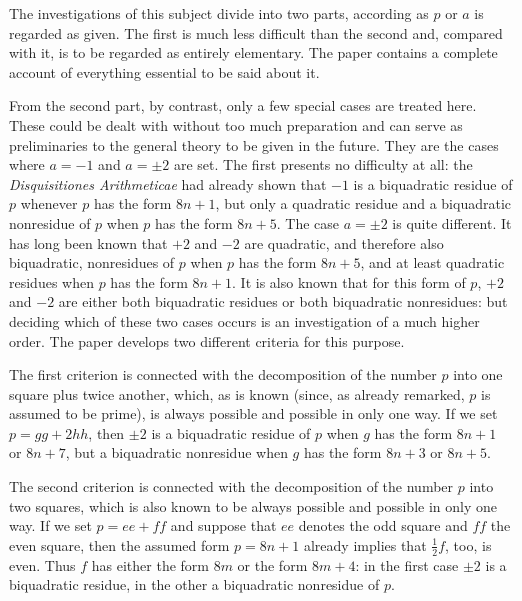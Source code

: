 The investigations of this subject divide into two parts, according as $p$ or $a$ is regarded as given. The first is much less difficult than the second and, compared with it, is to be regarded as entirely elementary. The paper contains a complete account of everything essential to be said about it.

From the second part, by contrast, only a few special cases are treated here. These could be dealt with without too much preparation and can serve as preliminaries to the general theory to be given in the future. They are the cases where $a=-1$ and $a=\pm2$ are set. The first presents no difficulty at all: the \emph{Disquisitiones Arithmeticae} had already shown that $-1$ is a biquadratic residue of $p$ whenever $p$ has the form $8n+1$, but only a quadratic residue and a biquadratic nonresidue of $p$ when $p$ has the form $8n+5$. The case $a=\pm2$ is quite different. It has long been known that $+2$ and $-2$ are quadratic, and therefore also biquadratic, nonresidues of $p$ when $p$ has the form $8n+5$, and at least quadratic residues when $p$ has the form $8n+1$. It is also known that for this form of $p$, $+2$ and $-2$ are either both biquadratic residues or both biquadratic nonresidues:
%
but deciding which of these two cases occurs is an investigation of a much higher order. The paper develops two different criteria for this purpose.

The first criterion is connected with the decomposition of the number $p$ into one square plus twice another, which, as is known (since, as already remarked, $p$ is assumed to be prime), is always possible and possible in only one way. If we set $p=gg+2hh$, then $\pm2$ is a biquadratic residue of $p$ when $g$ has the form $8n+1$ or $8n+7$, but a biquadratic nonresidue when $g$ has the form $8n+3$ or $8n+5$.

The second criterion is connected with the decomposition of the number $p$ into two squares, which is also known to be always possible and possible in only one way. If we set $p=ee+ff$ and suppose that $ee$ denotes the odd square and $ff$ the even square, then the assumed form $p=8n+1$ already implies that $\frac12f$, too, is even. Thus $f$ has either the form $8m$ or the form $8m+4$: in the first case $\pm2$ is a biquadratic residue, in the other a biquadratic nonresidue of $p$.

